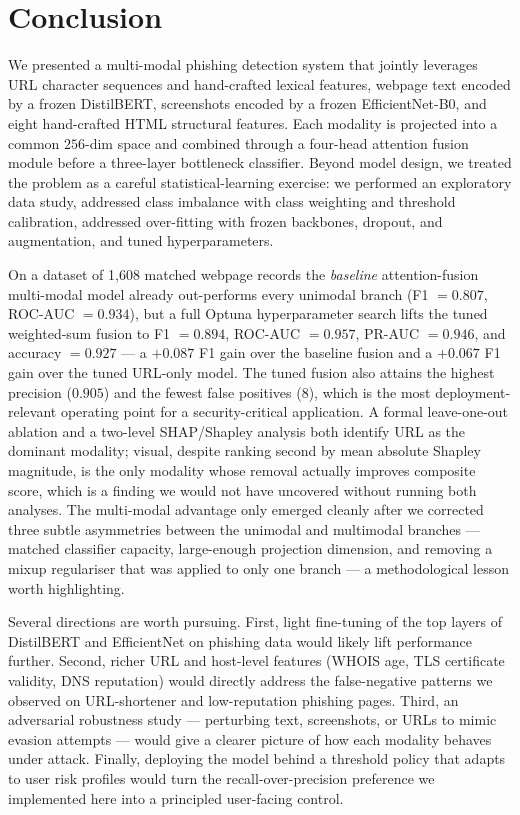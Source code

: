 \documentclass[conference]{IEEEtran}
\begin{document}
\section{Conclusion}
We presented a multi-modal phishing detection system that jointly
leverages URL character sequences and hand-crafted lexical
features, webpage text encoded by a frozen DistilBERT, screenshots
encoded by a frozen EfficientNet-B0, and eight hand-crafted HTML
structural features. Each modality is projected into a common
$256$-dim space and combined through a four-head attention fusion
module before a three-layer bottleneck classifier. Beyond model
design, we treated the problem as a careful statistical-learning
exercise: we performed an exploratory data study, addressed class
imbalance with class weighting and threshold calibration, addressed
over-fitting with frozen backbones, dropout, and augmentation, and
tuned hyperparameters.

On a dataset of 1{,}608 matched webpage records the
\emph{baseline} attention-fusion multi-modal model already
out-performs every unimodal branch (F1 $=0.807$, ROC-AUC $=0.934$),
but a full Optuna hyperparameter search lifts the tuned
weighted-sum fusion to F1 $=0.894$, ROC-AUC $=0.957$,
PR-AUC $=0.946$, and accuracy $=0.927$ --- a $+0.087$ F1 gain
over the baseline fusion and a $+0.067$ F1 gain over the tuned
URL-only model.  The tuned fusion also attains the highest
precision ($0.905$) and the fewest false positives ($8$), which
is the most deployment-relevant operating point for a
security-critical application.  A formal leave-one-out ablation
and a two-level SHAP/Shapley analysis both identify URL as the
dominant modality; visual, despite ranking second by mean
absolute Shapley magnitude, is the only modality whose removal
actually improves composite score, which is a finding we would
not have uncovered without running both analyses.  The
multi-modal advantage only emerged cleanly after we corrected
three subtle asymmetries between the unimodal and multimodal
branches --- matched classifier capacity, large-enough projection
dimension, and removing a mixup regulariser that was applied to
only one branch --- a methodological lesson worth highlighting.

Several directions are worth pursuing. First, light fine-tuning of
the top layers of DistilBERT and EfficientNet on phishing data
would likely lift performance further. Second, richer URL and
host-level features (WHOIS age, TLS certificate validity, DNS
reputation) would directly address the false-negative patterns we
observed on URL-shortener and low-reputation phishing pages.
Third, an adversarial robustness study --- perturbing text,
screenshots, or URLs to mimic evasion attempts --- would give a
clearer picture of how each modality behaves under attack.
Finally, deploying the model behind a threshold policy that adapts
to user risk profiles would turn the recall-over-precision
preference we implemented here into a principled user-facing
control.
\end{document}
